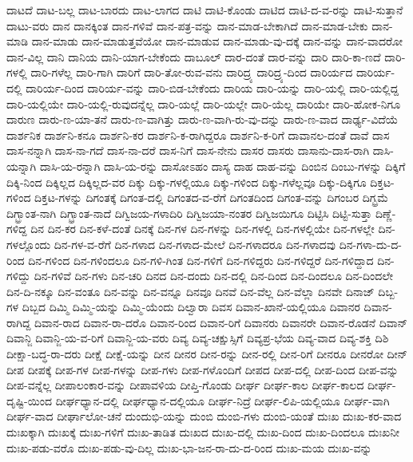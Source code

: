 {ದಾಟದೆ
ದಾಟ-ಬಲ್ಲ
ದಾಟ-ಬಾರದು
ದಾಟ-ಲಾಗದ
ದಾಟಿ
ದಾಟಿ-ಕೊಂಡು
ದಾಟಿದ
ದಾಟಿ-ದ-ವ-ರನ್ನು
ದಾಟಿ-ಸುತ್ತಾನೆ
ದಾಟು-ವರು
ದಾನ
ದಾನಕ್ಕಿಂತ
ದಾನ-ಗಳಿವೆ
ದಾನ-ಪತ್ರ-ವನ್ನು
ದಾನ-ಮಾಡ-ಬೇಕಾಗಿದೆ
ದಾನ-ಮಾಡ-ಬೇಕು
ದಾನ-ಮಾಡಿ
ದಾನ-ಮಾಡು
ದಾನ-ಮಾಡುತ್ತವೆಯೋ
ದಾನ-ಮಾಡುವ
ದಾನ-ಮಾಡು-ವು-ದಕ್ಕೆ
ದಾನ-ವನ್ನು
ದಾನ-ವಾದರೋ
ದಾನ-ವಿಲ್ಲ
ದಾನಿ
ದಾನಿಯ
ದಾನಿ-ಯಾಗ-ಬೇಕೆಂದು
ದಾಬೂಲ್
ದಾರ-ದಂತೆ
ದಾರ-ವನ್ನು
ದಾರಿ
ದಾರಿ-ಕಾ-ಣದೆ
ದಾರಿ-ಗಳಲ್ಲಿ
ದಾರಿ-ಗಳೆಲ್ಲ
ದಾರಿ-ಗಾಗಿ
ದಾರಿಗೆ
ದಾರಿ-ತೋ-ರುವ-ವನು
ದಾರಿದ್ರ್ಯ
ದಾರಿದ್ರ್ಯ-ದಿಂದ
ದಾರಿರ್ಯದ
ದಾರಿರ್ಯ-ದಲ್ಲಿ
ದಾರಿರ್ಯ-ದಿಂದ
ದಾರಿರ್ಯ-ವನ್ನು
ದಾರಿ-ಬಿಡ-ಬೇಕೆಂದು
ದಾರಿಯ
ದಾರಿ-ಯನ್ನು
ದಾರಿ-ಯಲ್ಲಿ
ದಾರಿ-ಯಲ್ಲಿದ್ದ
ದಾರಿ-ಯಲ್ಲಿಯೇ
ದಾರಿ-ಯಲ್ಲಿ-ರುವುದನ್ನೆಲ್ಲ
ದಾರಿ-ಯಲ್ಲೆ
ದಾರಿ-ಯಲ್ಲೇ
ದಾರಿ-ಯೆಲ್ಲ
ದಾರಿಯೇ
ದಾರಿ-ಹೋಕ-ನಿಗೂ
ದಾರುಣ
ದಾರು-ಣ-ಯಾ-ತನೆ
ದಾರು-ಣ-ವಾಗಿತ್ತು
ದಾರು-ಣ-ವಾಗಿ-ರು-ವು-ದನ್ನು
ದಾರು-ಣ-ವಾದ
ದಾರ್ಢ್ಯ-ವಿದೆಯೆ
ದಾರ್ಶನಿಕ
ದಾರ್ಶನಿ-ಕನೂ
ದಾರ್ಶನಿ-ಕರ
ದಾರ್ಶನಿ-ಕ-ರಾಗಿದ್ದರೂ
ದಾರ್ಶನಿ-ಕ-ರಿಗೆ
ದಾವಾನಲ-ದಂತೆ
ದಾವೆ
ದಾಸ
ದಾಸ-ನನ್ನಾಗಿ
ದಾಸ-ನಾ-ಗದೆ
ದಾಸ-ನಾ-ದರೆ
ದಾಸ-ನಿಗೆ
ದಾಸ-ನೇನು
ದಾಸರ
ದಾಸರು
ದಾಸಾನು-ದಾಸ-ರಾಗಿ
ದಾಸಿ-ಯನ್ನಾಗಿ
ದಾಸಿ-ಯ-ರನ್ನಾಗಿ
ದಾಸಿ-ಯ-ರನ್ನು
ದಾಸೋಽಹಂ
ದಾಸ್ಯ
ದಾಹ
ದಾಹ-ವನ್ನು
ದಿಂಬಿನ
ದಿಂಬು-ಗಳನ್ನು
ದಿಕ್ಕಿಗೆ
ದಿಕ್ಕಿ-ನಿಂದ
ದಿಕ್ಕಿಲ್ಲದ
ದಿಕ್ಕಿಲ್ಲದ-ವರ
ದಿಕ್ಕು
ದಿಕ್ಕು-ಗಳಲ್ಲಿಯೂ
ದಿಕ್ಕು-ಗಳಿಂದ
ದಿಕ್ಕು-ಗಳೆಲ್ಲವೂ
ದಿಕ್ಕು-ದಿಕ್ಕಿಗೂ
ದಿಕ್ತಟ-ಗಳಿಂದ
ದಿಕ್ತಟ-ಗಳನ್ನು
ದಿಗಂತಕ್ಕೆ
ದಿಗಂತ-ದಲ್ಲಿ
ದಿಗಂತದ-ವ-ರೆಗೆ
ದಿಗಂತದಿಂದ
ದಿಗಂತ-ವನ್ನು
ದಿಗಂಬರ
ದಿಗ್ಭ್ರಮೆ
ದಿಗ್ಭ್ರಾಂತ-ನಾಗಿ
ದಿಗ್ಭ್ರಾಂತ-ನಾದೆ
ದಿಗ್ವಿಜಯ-ಗಳಾದಿರಿ
ದಿಗ್ವಿಜಯಾ-ನಂತರ
ದಿಗ್ವಿಜಯಿಗೂ
ದಿಟ್ಟಿಸಿ
ದಿಟ್ಟಿ-ಸುತ್ತಾ
ದಿಣ್ಣೆ-ಗಳಿದ್ದ
ದಿನ
ದಿನ-ಕರ
ದಿನ-ಕಳೆ-ದಂತೆ
ದಿನಕ್ಕೆ
ದಿನ-ಗಳ
ದಿನ-ಗಳನ್ನು
ದಿನ-ಗಳಲ್ಲಿ
ದಿನ-ಗಳಲ್ಲಿಯೇ
ದಿನ-ಗಳಲ್ಲೇ
ದಿನ-ಗಳಲ್ಲೊಂದು
ದಿನ-ಗಳ-ವ-ರೆಗೆ
ದಿನ-ಗಳಾದ
ದಿನ-ಗಳಾದ-ಮೇಲೆ
ದಿನ-ಗಳಾದರೂ
ದಿನ-ಗಳಾದವು
ದಿನ-ಗಳಾ-ದು-ದ-ರಿಂದ
ದಿನ-ಗಳಿಂದ
ದಿನ-ಗಳಿಂದಲೂ
ದಿನ-ಗಳಿ-ಗಿಂತ
ದಿನ-ಗಳಿಗೆ
ದಿನ-ಗಳಿದ್ದರು
ದಿನ-ಗಳಿದ್ದರೆ
ದಿನ-ಗಳಿದ್ದಾದ
ದಿನ-ಗಳಿದ್ದು
ದಿನ-ಗಳಿವೆ
ದಿನ-ಗಳು
ದಿನ-ಚರಿ
ದಿನದ
ದಿನ-ದಂದು
ದಿನ-ದಲ್ಲಿ
ದಿನ-ದಿಂದ
ದಿನ-ದಿಂದಲೂ
ದಿನ-ದಿಂದಲೇ
ದಿನ-ದಿ-ನಕ್ಕೂ
ದಿನ-ವಂತೂ
ದಿನ-ವನ್ನು
ದಿನ-ವನ್ನೂ
ದಿನವೂ
ದಿನವೆ
ದಿನ-ವೆಲ್ಲ
ದಿನ-ವೆಲ್ಲಾ
ದಿನವೇ
ದಿನಾಜ್
ದಿಬ್ಬ-ಗಳ
ದಿಬ್ಬದ
ದಿಮ್ಮಿ
ದಿಮ್ಮಿ-ಯನ್ನು
ದಿಮ್ಮಿ-ಯೆಂದು
ದಿಲ್ವಾರಾ
ದಿವಸ
ದಿವಾನ-ಖಾನೆ-ಯಲ್ಲಿಯೂ
ದಿವಾನರ
ದಿವಾನ-ರಾಗಿದ್ದ
ದಿವಾನ-ರಾದ
ದಿವಾನ-ರಾ-ದರೊ
ದಿವಾನ-ರಿಂದ
ದಿವಾನ-ರಿಗೆ
ದಿವಾನರು
ದಿವಾನರೇ
ದಿವಾನ-ರೊಡನೆ
ದಿವಾನ್
ದಿವಾನ್ಜಿ
ದಿವಾನ್ಜಿ-ಯ-ವ-ರಿಗೆ
ದಿವಾನ್ಜಿ-ಯ-ವರು
ದಿವ್ಯ
ದಿವ್ಯ-ಚಕ್ಷುಸ್ಸಿಗೆ
ದಿವ್ಯಪ್ರ-ಭೆಯ
ದಿವ್ಯ-ವಾದ
ದಿವ್ಯ-ಶಕ್ತಿ
ದಿಶಿ
ದೀಕ್ಷಾ-ಬದ್ಧ-ರಾ-ದರು
ದೀಕ್ಷೆ
ದೀಕ್ಷೆ-ಯನ್ನು
ದೀನ
ದೀನರ
ದೀನ-ರನ್ನು
ದೀನ-ರಲ್ಲಿ
ದೀನ-ರಿಗೆ
ದೀನರೂ
ದೀನರೋ
ದೀನ್
ದೀಪ
ದೀಪಕ್ಕೆ
ದೀಪ-ಗಳ
ದೀಪ-ಗಳನ್ನು
ದೀಪ-ಗಳು
ದೀಪ-ಗಳೊಂದಿಗೆ
ದೀಪದ
ದೀಪ-ದಲ್ಲಿ
ದೀಪ-ದಿಂದ
ದೀಪ-ವನ್ನು
ದೀಪ-ವನ್ನೆಲ್ಲ
ದೀಪಾಲಂಕಾರ-ವನ್ನು
ದೀಪಾವಳಿಯ
ದೀಪ್ತಿ-ಗೊಂಡು
ದೀರ್ಘ
ದೀರ್ಘ-ಕಾಲ
ದೀರ್ಘ-ಕಾಲದ
ದೀರ್ಘ-ದೃಷ್ಟಿ-ಯಿಂದ
ದೀರ್ಘಧ್ಯಾನ-ದಲ್ಲಿ
ದೀರ್ಘಧ್ಯಾನ-ದಲ್ಲಿಯೂ
ದೀರ್ಘ-ನಿದ್ರೆ
ದೀರ್ಘ-ಲಿಪಿ-ಯಲ್ಲಿಯೂ
ದೀರ್ಘ-ವಾಗಿ
ದೀರ್ಘ-ವಾದ
ದೀರ್ಘಾಲೋ-ಚನೆ
ದುಂದುಭಿ-ಯನ್ನು
ದುಂಬಿ
ದುಂಬಿ-ಗಳು
ದುಂಬಿ-ಯಂತೆ
ದುಃಖ
ದುಃಖ-ಕರ-ವಾದ
ದುಃಖಕ್ಕಾಗಿ
ದುಃಖಕ್ಕೆ
ದುಃಖ-ಗಳಿಗೆ
ದುಃಖ-ತಾಡಿತ
ದುಃಖದ
ದುಃಖ-ದಲ್ಲಿ
ದುಃಖ-ದಿಂದ
ದುಃಖ-ದಿಂದಲೂ
ದುಃಖನೀ
ದುಃಖ-ಪಡು-ವರೊ
ದುಃಖ-ಪಡು-ವು-ದಿಲ್ಲ
ದುಃಖ-ಭಾ-ಜನ-ರಾ-ದು-ದ-ರಿಂದ
ದುಃಖ-ಮಯ
ದುಃಖ-ವನ್ನು
}
